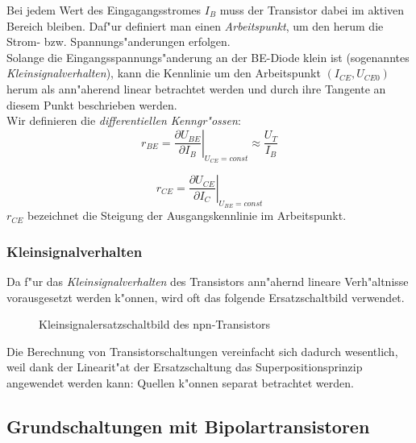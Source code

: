 \documentclass[german, 10pt, a4paper, headsepline]{scrreprt}
\theoremstyle{remark}
\begin{document}
Bei jedem Wert des Eingagangsstromes $I_B$ muss der Transistor dabei im aktiven Bereich bleiben. Daf"ur definiert man einen \textit{Arbeitspunkt}, um den herum die Strom- bzw. Spannungs"anderungen erfolgen.\\

Solange die Eingangsspannungs"anderung an der BE-Diode klein ist (sogenanntes \textit{Klein\-signalverhalten}), kann die Kennlinie um den Arbeitspunkt $(I_{CE},U_{CE0})$ herum als ann"aherend linear betrachtet werden und durch ihre Tangente an diesem Punkt be\-schrieben werden.\\

Wir definieren die \textit{differentiellen Kenngr"ossen}:
\begin{displaymath}
	r_{BE} = \left . \frac{\partial U_{BE}}{\partial I_B}\right |_{U_{CE}=const}\approx \frac{U_T}{I_B}
\end{displaymath}

\begin{displaymath}
	r_{CE} = \left . \frac{\partial U_{CE}}{\partial I_C}\right |_{U_{BE}=const}
\end{displaymath}
$r_{CE}$ bezeichnet die Steigung der Ausgangskennlinie im Arbeitspunkt.

\subsubsection{Kleinsignalverhalten}

Da f"ur das \textit{Kleinsignalverhalten} des Transistors ann"ahernd lineare Verh"altnisse vorausgesetzt werden k"onnen, wird oft das folgende Ersatzschaltbild verwendet.

\begin{figure}[hbt]
 
 \centerline{\box\graph}
 \caption{Kleinsignalersatzschaltbild des npn-Transistors}
 \label{kleinsignal_ersatz}
\end{figure}

Die Berechnung von Transistorschaltungen vereinfacht sich dadurch wesentlich, weil dank der Linearit"at der Ersatzschaltung das Superpositionsprinzip angewendet werden kann: Quellen k"onnen separat betrachtet werden.

\pagebreak

\subsection{Grundschaltungen mit Bipolartransistoren}
\end{document}
